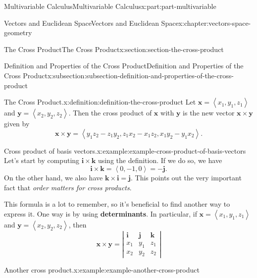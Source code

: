 \documentclass[twoside,10pt,]{tufte-book}
\newcommand{\terminology}[1]{\textbf{#1}}
\numberwithin{equation}{part}
\newcommand{\dotprod}[1]{\left\langle #1 \right\rangle}
\begin{document}
\begin{partptx}{Multivariable Calculus}{}{Multivariable Calculus}{}{}{x:part:part-multivariable}
\begin{chapterptx}{Vectors and Euclidean Space}{}{Vectors and Euclidean Space}{}{}{x:chapter:vectors-space-geometry}
\begin{sectionptx}{The Cross Product}{}{The Cross Product}{}{}{x:section:section-the-cross-product}
\begin{introduction}{}
\end{introduction}%
%
%
\typeout{************************************************}
\typeout{************************************************}
%
\begin{subsectionptx}{Definition and Properties of the Cross Product}{}{Definition and Properties of the Cross Product}{}{}{x:subsection:subsection-definition-and-properties-of-the-cross-product}
\begin{definition}{The Cross Product.}{x:definition:definition-the-cross-product}%
%
Let \(\mathbf{x} = \dotprod{x_{1},y_{1},z_{1}}\) and \(\mathbf{y} = \dotprod{x_{2},y_{2},z_{2}}\). Then the cross product of \(\mathbf{x}\) with \(\mathbf{y}\) is the new vector \(\mathbf{x}\times\mathbf{y}\) given by%
%
\begin{equation*}
\mathbf{x}\times\mathbf{y} = \dotprod{y_{1}z_{2}-z_{1}y_{2}, z_{1}x_{2}-x_{1}z_{2}, x_{1}y_{2} - y_{1}x_{2}}.
\end{equation*}
\end{definition}
\begin{example}{Cross product of basis vectors.}{x:example:example-cross-product-of-basis-vectors}%
Let's start by computing \(\mathbf{i}\times\mathbf{k}\) using the definition. If we do so, we have%
%
\begin{equation*}
\mathbf{i}\times\mathbf{k} = \dotprod{0,-1,0} = -\mathbf{j}.
\end{equation*}
On the other hand, we also have \(\mathbf{k}\times\mathbf{i} = \mathbf{j}\). This points out the very important fact that \emph{order matters for cross products}.%
\end{example}
This formula is a lot to remember, so it's beneficial to find another way to express it. One way is by using \terminology{determinants}. In particular, if \(\mathbf{x} = \dotprod{x_{1},y_{1},z_{1}}\) and \(\mathbf{y} = \dotprod{x_{2},y_{2},z_{2}}\), then%
%
\begin{equation}
\mathbf{x}\times\mathbf{y} = \left|\begin{array}{ccc}
\mathbf{i} & \mathbf{j} & \mathbf{k} \\ x_{1} & y_{1} & z_{1} \\ x_{2} & y_{2} & z_{2} \end{array}\right|\label{x:men:equation-cross-product-determinant}
\end{equation}
\begin{example}{Another cross product.}{x:example:example-another-cross-product}%

\end{example}
\end{subsectionptx}
\end{sectionptx}
\end{chapterptx}
\end{partptx}
\end{document}
